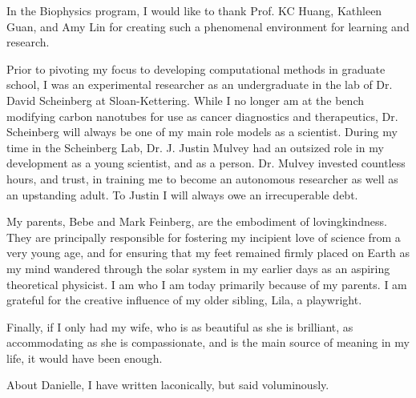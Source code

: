 \begin{acknowledgments}
In the Biophysics program, I would like to thank Prof. KC Huang, Kathleen Guan, and Amy Lin for creating such a phenomenal environment for learning and research.

Prior to pivoting my focus to developing computational methods in graduate school, I was an experimental researcher as an undergraduate in the lab of Dr. David Scheinberg at Sloan-Kettering. While I no longer am at the bench modifying carbon nanotubes for use as cancer diagnostics and therapeutics, Dr. Scheinberg will always be one of my main role models as a scientist. During my time in the Scheinberg Lab, Dr. J. Justin Mulvey had an outsized role in my development as a young scientist, and as a person. Dr. Mulvey invested countless hours, and trust, in training me to become an autonomous researcher as well as an upstanding adult. To Justin I will always owe an irrecuperable debt.

My parents, Bebe and Mark Feinberg, are the embodiment of lovingkindness. They are principally responsible for fostering my incipient love of science from a very young age, and for ensuring that my feet remained firmly placed on Earth as my mind wandered through the solar system in my earlier days as an aspiring theoretical physicist. I am who I am today primarily because of my parents. I am grateful for the creative influence of my older sibling, Lila, a playwright.

Finally, if I only had my wife, who is as beautiful as she is brilliant, as accommodating as she is compassionate, and is the main source of meaning in my life, it would have been enough.

About Danielle, I have written laconically, but said voluminously.
\end{acknowledgments}


\tableofcontents

